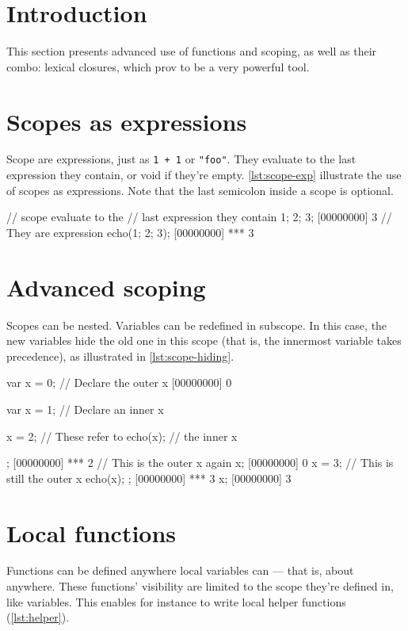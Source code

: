 \section{Introduction}

This section presents advanced use of functions and scoping, as well
as their combo: lexical closures, which prov to be a very powerful
tool.

\section{Scopes as expressions}

Scope are expressions, just as \lstinline|1 + 1| or \lstinline|"foo"|.
They evaluate to the last expression they contain, or void if they're
empty. \autoref{lst:scope-exp} illustrate the use of scopes as
expressions. Note that the last semicolon inside a scope is optional.

\begin{urbiscript}[caption=Using scope as expressions,label=lst:scope-exp]
// scope evaluate to the
// last expression they contain
{ 1; 2; 3};
[00000000] 3
// They are expression
echo({1; 2; 3});
[00000000] *** 3
\end{urbiscript}

\section{Advanced scoping}

Scopes can be nested. Variables can be redefined in subscope. In this
case, the new variables hide the old one in this scope (that is, the
innermost variable takes precedence), as illustrated in
\autoref{lst:scope-hiding}.

\begin{urbiscript}[caption=Redefining variables in
  subscopes,label=lst:scope-hiding]
var x = 0; // Declare the outer x
[00000000] 0
{
  var x = 1; // Declare an inner x

  x = 2;    // These refer to
  echo(x);  // the inner x
};
[00000000] *** 2
// This is the outer x again
x;
[00000000] 0
{
  x = 3; // This is still the outer x
  echo(x);
};
[00000000] *** 3
x;
[00000000] 3
\end{urbiscript}

\section{Local functions}

Functions can be defined anywhere local variables can --- that is,
about anywhere. These functions' visibility are limited to the scope
they're defined in, like variables. This enables for instance to write
local helper functions (\autoref{lst:helper}).

